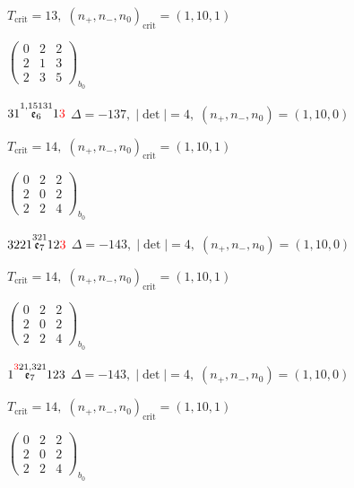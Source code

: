 \documentclass[10pt]{article}
\begin{document}
\hspace{1em}$T_{\text{crit}}=13,\; (n_+,n_-,n_0)_{\text{crit}}=(1,10,1)$

\hspace{2em}$\left(\begin{smallmatrix}0 & 2 & 2 \\ 2 & 1 & 3 \\ 2 & 3 & 5\end{smallmatrix}\right)_{\!b_0}$

\smallskip

$31\overset{1,15131}{\mathfrak{e}_6}1\textcolor{red}{3}$ \quad $\Delta=-137,\; |\det|=4,\; (n_+,n_-,n_0)=(1,10,0)$

\hspace{1em}$T_{\text{crit}}=14,\; (n_+,n_-,n_0)_{\text{crit}}=(1,10,1)$

\hspace{2em}$\left(\begin{smallmatrix}0 & 2 & 2 \\ 2 & 0 & 2 \\ 2 & 2 & 4\end{smallmatrix}\right)_{\!b_0}$

\smallskip

$3221\overset{321}{\mathfrak{e}_7}12\textcolor{red}{3}$ \quad $\Delta=-143,\; |\det|=4,\; (n_+,n_-,n_0)=(1,10,0)$

\hspace{1em}$T_{\text{crit}}=14,\; (n_+,n_-,n_0)_{\text{crit}}=(1,10,1)$

\hspace{2em}$\left(\begin{smallmatrix}0 & 2 & 2 \\ 2 & 0 & 2 \\ 2 & 2 & 4\end{smallmatrix}\right)_{\!b_0}$

\smallskip

$1\overset{\textcolor{red}{3}21,321}{\mathfrak{e}_7}123$ \quad $\Delta=-143,\; |\det|=4,\; (n_+,n_-,n_0)=(1,10,0)$

\hspace{1em}$T_{\text{crit}}=14,\; (n_+,n_-,n_0)_{\text{crit}}=(1,10,1)$

\hspace{2em}$\left(\begin{smallmatrix}0 & 2 & 2 \\ 2 & 0 & 2 \\ 2 & 2 & 4\end{smallmatrix}\right)_{\!b_0}$
\end{document}
